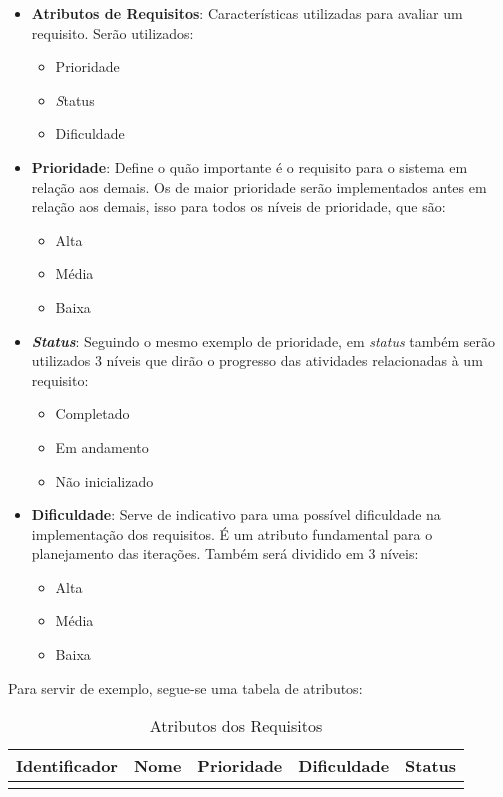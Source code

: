 \begin{itemize}
\item \textbf{Atributos de Requisitos}: Características utilizadas para avaliar um requisito. Serão utilizados:

\begin{itemize}
\item Prioridade
\item \textit Status
\item Dificuldade
\end{itemize}

\item \textbf{Prioridade}: Define o quão importante é o requisito para o sistema em relação aos demais. Os de maior prioridade serão implementados antes em relação aos demais, isso para todos os níveis de prioridade, que são:

\begin{itemize}
\item Alta
\item Média
\item Baixa
\end{itemize}

\item \textbf{\textit{Status}}: Seguindo o mesmo exemplo de prioridade, em \textit{status} também serão utilizados 3 níveis que dirão o progresso das atividades relacionadas à um requisito:

\begin{itemize}
\item Completado
\item Em andamento
\item Não inicializado
\end{itemize}

\item \textbf{Dificuldade}: Serve de indicativo para uma possível dificuldade na implementação dos requisitos. É um atributo fundamental para o planejamento das iterações. Também será dividido em 3 níveis:

\begin{itemize}
\item Alta
\item Média
\item Baixa
\end{itemize}
\end{itemize}

Para servir de exemplo, segue-se uma tabela de atributos:

\begin{table}[h]
\centering
\label{requirements-qualities}
\begin{tabular}{|l|l|l|l|l|}
\hline
\textbf{Identificador} & \textbf{Nome} & \textbf{Prioridade} & \textbf{Dificuldade} & \textbf{Status} \\ \hline
                       &               &                     &                      &                 \\ \hline
\end{tabular}
\caption{Atributos dos Requisitos}
\end{table}


